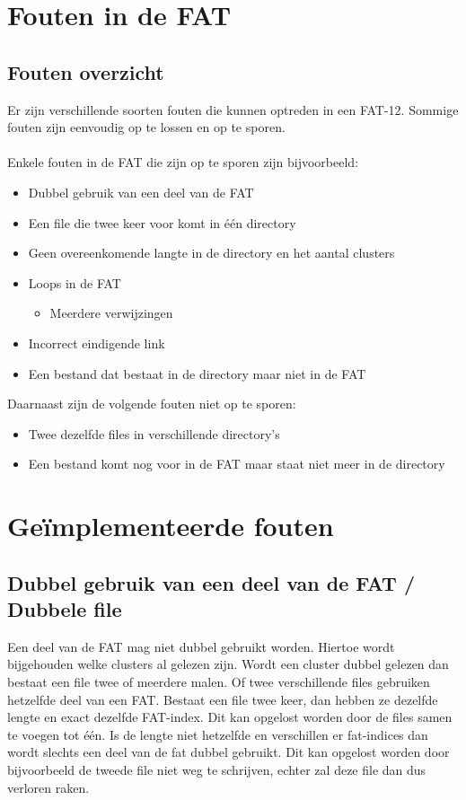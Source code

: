 \documentclass[11pt]{article}
\begin{document}
	\newpage

	\section{Fouten in de FAT}\label{sec:fout}
	\subsection{Fouten overzicht}\label{sec:overzicht}
	Er zijn verschillende soorten fouten die kunnen optreden in een FAT-12. Sommige fouten zijn eenvoudig op te lossen en op te sporen.\\\\
	Enkele fouten in de FAT die zijn op te sporen zijn bijvoorbeeld:
	\begin{itemize}
		\item Dubbel gebruik van een deel van de FAT
		\item Een file die twee keer voor komt in \'e\'en directory
		\item Geen overeenkomende langte in de directory en het aantal clusters
		\item Loops in de FAT
		\begin{itemize}
			\item Meerdere verwijzingen 
		\end{itemize}
		\item Incorrect eindigende link
		\item Een bestand dat bestaat in de directory maar niet in de FAT
	\end{itemize}
	Daarnaast zijn de volgende fouten niet op te sporen:
	\begin{itemize}
		\item Twee dezelfde files in verschillende directory's
		\item Een bestand komt nog voor in de FAT maar staat niet meer in de directory
	\end{itemize}

	\newpage

	\section{Ge\"implementeerde fouten}\label{sec:impfout}
	\subsection{Dubbel gebruik van een deel van de FAT / Dubbele file}\label{sec:dubbel}
	Een deel van de FAT mag niet dubbel gebruikt worden. Hiertoe wordt bijgehouden welke clusters al gelezen zijn. Wordt een cluster dubbel gelezen dan bestaat een file twee of meerdere malen. Of twee verschillende files gebruiken hetzelfde deel van een FAT. Bestaat een file twee keer, dan hebben ze dezelfde lengte en exact dezelfde FAT-index. Dit kan opgelost worden door de files samen te voegen tot \'e\'en. Is de lengte niet hetzelfde en verschillen er fat-indices dan wordt slechts een deel van de fat dubbel gebruikt. Dit kan opgelost worden door bijvoorbeeld de tweede file niet weg te schrijven, echter zal deze file dan dus verloren raken. 
\end{document}

